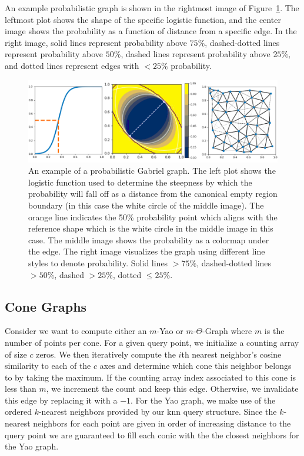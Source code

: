 An example probabilistic graph is shown in the rightmost image of Figure~\ref{fig:probabilistic_beta}.
%
The leftmost plot shows the shape of the specific logistic function, and the center image shows the probability as a function of distance from a specific edge.
%
In the right image, solid lines represent probability above $75\%$, dashed-dotted lines represent probability above $50\%$, dashed lines represent probability above $25\%$, and dotted lines represent edges with $<25\%$ probability.

\begin{figure}[htbp]
    \includegraphics[width=\linewidth]{figs/chap7/probabilistic_beta.png}
    \caption{An example of a probabilistic Gabriel graph.
    The left plot shows the logistic function used to determine the steepness by which the probability will fall off as a distance from the canonical empty region boundary (in this case the white circle of the middle image).
    The orange line indicates the 50\% probability point which aligns with the reference shape which is the white circle in the middle image in this case.
    The middle image shows the probability as a colormap under the edge.
    The right image visualizes the graph using different line styles to denote probability.
    Solid lines $>75\%$, dashed-dotted lines $>50\%$, dashed $>25\%$, dotted $\leq25\%$.}
    \label{fig:probabilistic_beta}
\end{figure}

\subsection{Cone Graphs}

Consider we want to compute either an $m$-Yao or $m$-$\Theta$-Graph where $m$ is the number of points per cone.
%
For a given query point, we initialize a counting array of size $c$ zeros.
%
We then iteratively compute the $i$th nearest neighbor's cosine similarity to each of the $c$ axes and determine which cone this neighbor belongs to by taking the maximum.
%
If the counting array index associated to this cone is less than $m$, we increment the count and keep this edge.
%
Otherwise, we invalidate this edge by replacing it with a $-1$.
%
For the Yao graph, we make use of the ordered $k$-nearest neighbors provided by our knn query structure.
%
Since the $k$-nearest neighbors for each point are given in order of increasing distance to the query point we are guaranteed to fill each conic with the the closest neighbors for the Yao graph.

